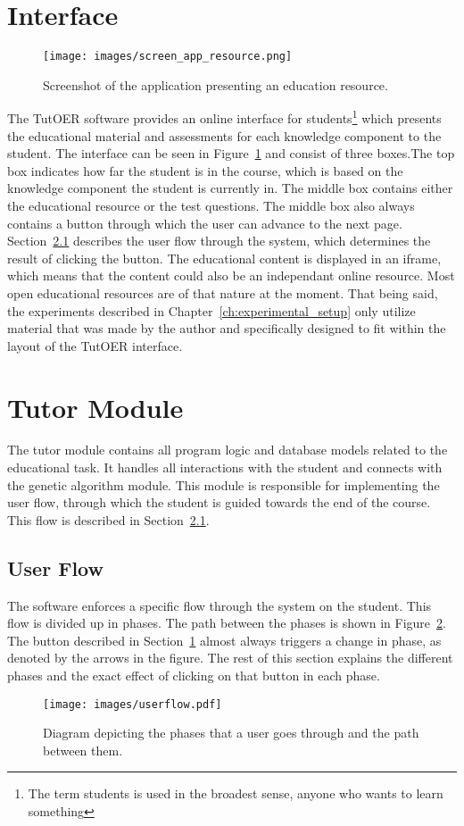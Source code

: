 \section{Interface}
\label{sec:software_interface}
\begin{figure}[ht!]
	\centering
	\texttt{[image: images/screen\_app\_resource.png]}
	\caption[Application screenshot - Resource]{Screenshot of the application
	presenting an education resource.}
	\label{fig:screen_app_resource}
\end{figure}
The TutOER software provides an online interface for
students\footnote{The term students is used in the broadest sense, anyone who
wants to learn something} which presents the educational material and
assessments for each knowledge component to the student. The interface can be
seen in Figure~\ref{fig:screen_app_resource} and consist of three boxes.The
top box indicates how far the student is in the course, which is based on
the knowledge component the student is currently in. The middle box contains
either the educational resource or the test questions.
The middle box also always contains a button through which the user can advance
to the next page. Section~\ref{sec:software_user_flow} describes the user flow
through the system, which determines the result of clicking the button. The
educational content is displayed in an iframe, which means that the content
could also be an independant online resource. Most open educational resources
are of that nature at the moment. That being said, the experiments described in
Chapter~\ref{ch:experimental_setup} only utilize material that was made by the
author and specifically designed to fit within the layout of the TutOER
interface.
\section{Tutor Module}
\label{sec:software_tutor_module}
The tutor module contains all program logic and database models related to the
educational task. It handles all interactions with the student and connects
with the genetic algorithm module. This module is responsible for implementing
the user flow, through which the student is guided towards the end of the
course. This flow is described in Section~\ref{sec:software_user_flow}.
\subsection{User Flow}
\label{sec:software_user_flow}
The software enforces a specific flow through the system on the student. This
flow is divided up in phases. The path between the phases is shown in
Figure~\ref{fig:userflow}. The button described in
Section~\ref{sec:software_interface} almost always triggers a change in phase,
as denoted by the arrows in the figure. The rest of this section explains the
different phases and the exact effect of clicking on that button in each phase.
\begin{figure}[ht!]
	\centering
	\texttt{[image: images/userflow.pdf]}
	\caption[User flow diagram]{Diagram depicting the phases that a user goes
	through and the path between them.}
	\label{fig:userflow}
\end{figure}
